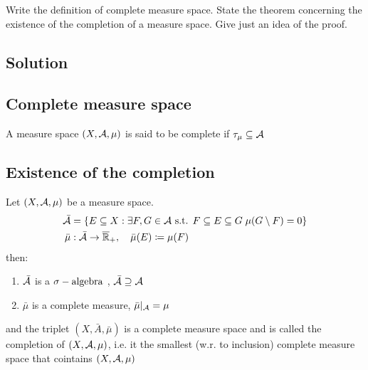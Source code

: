 \sheet



\question
Write the definition of complete measure space. State the theorem concerning the existence of the completion of a measure space. Give just an idea of the proof.

\subsection*{Solution}

\subsection{Complete measure space}
A measure space $(X,\mathcal{A},\mu)$ is said to be complete if $\tau_{\mu}\subseteq\mathcal{A}$

\subsection{Existence of the completion}
Let $(X,\mathcal{A},\mu)$ be a measure space. \provdef{$\bar{\A}, \bar{\mu}$}
\begin{align*}
\bar{\mathcal{A}} &=\{ E\subseteq X: \exists F,G \in \mathcal{A} \text{ s.t. } F\subseteq E \subseteq G \; \mu(G \setminus F) =0 \}\\
\bar{\mu} & : \bar{\mathcal{A}}\to\overline{\mathbb{R}}_{+},\quad \bar{\mu}(E) \coloneqq \mu(F) 
\end{align*}
then:
\begin{enumerate}
    \item $\bar{\mathcal{A}}$ is a $\sigma-\text{algebra}$ , $\bar{\mathcal{A}} \supseteq \mathcal{A}$
    \item $\bar{\mu}$ is a complete measure, $\bar{\mu}|_{\mathcal{A}}=\mu$
\end{enumerate}
and the triplet $(X,\bar{A}, \bar{\mu})$ is a complete measure space and is called the completion of $(X,\mathcal{A},\mu)$, i.e. it the smallest (w.r. to inclusion) complete measure space that cointains $(X,\mathcal{A},\mu)$
